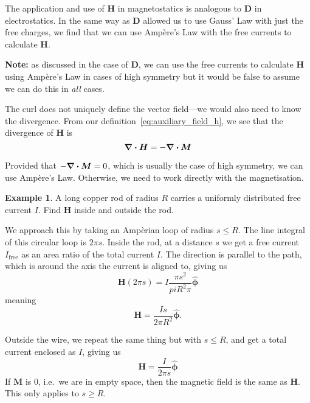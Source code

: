\documentclass[12pt,chapterprefix=false,dvipsnames]{scrbook}
\theoremstyle{dotless}
\theoremstyle{definition}
\newtheorem{protoexample}{Example}[section]
\newenvironment{example}
{\colorlet{shadecolor}{red!15}\begin{shaded}\begin{protoexample}}
			{\end{protoexample}\end{shaded}}
\begin{document}
The application and use of $\bm{H}$ in
magnetostatics is analogous to $\bm{D}$ in
electrostatics. In the same way as $\bm{D}$
allowed us to use Gauss' Law with just the free charges, we find
that we can use Ampère's Law with the free currents to calculate
$\bm{H}$.

\textbf{Note:} as discussed in the case of
$\bm{D}$, we can use the free currents to
calculate $\bm{H}$ using Ampère's Law in cases of
high symmetry but it would be false to assume we can do this in
\textit{all} cases.

The curl does not uniquely define the vector field---we would
also need to know the divergence. From our
definition~\ref{eq:auxiliary_field_h}, we see that the divergence
of $\bm{H}$ is
\begin{equation}
	\label{eq:auxiliary_field_divergence}
	\divergence{\bm{H}}
	=
	-\divergence{\bm{M}}
\end{equation}

Provided that $-\divergence{\bm{M}} = 0$, which is usually the case
of high symmetry, we can use Ampère's Law. Otherwise, we need to
work directly with the magnetisation.

\begin{example}
	A long copper rod of radius $R$ carries a
	uniformly distributed free current $I$. Find
	$\bm{H}$ inside and outside the rod.

	We approach this by taking an Ampèrian loop of radius
	$s \leq R$. The line integral of this circular loop
	is $2\pi s$. Inside the rod, at a distance
	$s$ we get a free current
	$I_\textrm{free}$ as an area ratio of the total current
	$I$. The direction is parallel to the path,
	which is around the axis the current is aligned to, giving us
	\begin{equation}
		\bm{H}\left(2\pi s\right)  =
		I\frac{\pi s^2}{pi R^2\pi}\bm{\hat{\phi}}
	\end{equation}
    meaning
    \begin{equation}
       \bm{H} = \frac{Is}{2\pi R^2} \bm{\hat{\phi}}.
    \end{equation}
    
    Outside the wire, we repeat the same thing but with $s \leq R$, and get a total current enclosed as $I$, giving us
    \begin{equation}
       \bm{H} = \frac{I}{2\pi s}\bm{\hat{\phi}}
    \end{equation}
    If $\bm{M}$ is 0, i.e.\ we are in empty space, then the magnetic field is the same as $\bm{H}$. This only applies to $s \geq R$.
\end{example}
\end{document}
